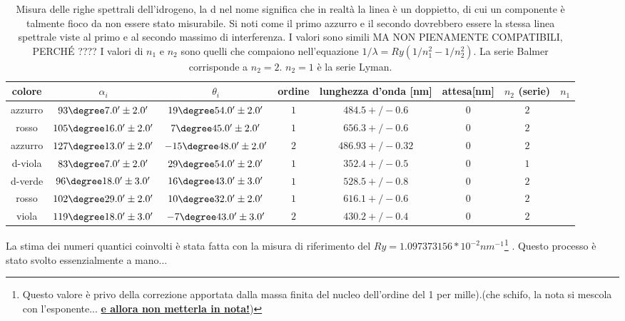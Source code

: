 \documentclass[a4paper,10pt]{article}
\begin{document}
{{{{{{\begin{table}[H]
	\centering
	\begin{tabular}{c|c|c|c|c|c|c|c}
		colore & $\alpha_i$ &	$\theta_i$ & ordine & lunghezza d'onda [nm] & attesa[nm]& $n_2$ (serie) & $n_1$\\
		\hline
azzurro &  $ 93\degree 7.0' \pm 2.0 ' $  &  $ 19\degree 54.0' \pm 2.0 ' $  &  $ 1 $ & $ 484.5+/-0.6 $ & $ 0 $ & $ 2 $ \\
rosso &  $ 105\degree 16.0' \pm 2.0 ' $  &  $ 7\degree 45.0' \pm 2.0 ' $  &  $ 1 $ & $ 656.3+/-0.6 $ & $ 0 $ & $ 2 $ \\
azzurro &  $ 127\degree 13.0' \pm 2.0 ' $  &  $ -15\degree 48.0' \pm 2.0 ' $  &  $ 2 $ & $ 486.93+/-0.32 $ & $ 0 $ & $ 2 $ \\
d-viola &  $ 83\degree 7.0' \pm 2.0 ' $  &  $ 29\degree 54.0' \pm 2.0 ' $  &  $ 1 $ & $ 352.4+/-0.5 $ & $ 0 $ & $ 1 $ \\
d-verde &  $ 96\degree 18.0' \pm 3.0 ' $  &  $ 16\degree 43.0' \pm 3.0 ' $  &  $ 1 $ & $ 528.5+/-0.8 $ & $ 0 $ & $ 2 $ \\
rosso &  $ 102\degree 29.0' \pm 2.0 ' $  &  $ 10\degree 32.0' \pm 2.0 ' $  &  $ 1 $ & $ 616.1+/-0.6 $ & $ 0 $ & $ 2 $ \\
viola &  $ 119\degree 18.0' \pm 3.0 ' $  &  $ -7\degree 43.0' \pm 3.0 ' $  &  $ 2 $ & $ 430.2+/-0.4 $ & $ 0 $ & $ 2 $ \\
	\end{tabular}
	\caption{Misura delle righe spettrali dell'idrogeno, la d nel nome significa che in realtà la linea è un doppietto, di cui un componente è talmente fioco da non essere stato misurabile. Si noti come il primo azzurro e il secondo dovrebbero essere la stessa linea spettrale viste al primo e al secondo massimo di interferenza. I valori sono simili MA NON PIENAMENTE COMPATIBILI, PERCH\'E ????
I valori di $n_1$ e $n_2$ sono quelli che compaiono nell'equazione $1/\lambda=Ry(1/n_1^2-1/n_2^2)$. La serie Balmer corrisponde a $n_2=2$. $n_2=1$ è la serie Lyman.	
	}
	\label{tab:HH}
\end{table}

La stima dei numeri quantici coinvolti è stata fatta con la misura di riferimento del $Ry=1.097373156 * 10^{-2} nm^{-1}$\footnote{ Questo valore è privo della correzione apportata dalla massa finita del nucleo dell'ordine del 1 per mille).(che schifo, la nota si mescola con l'esponente... \underline{\textbf{e allora non metterla in nota!}})} . Questo processo è stato svolto essenzialmente a mano...

}}}}}}
\end{document}
